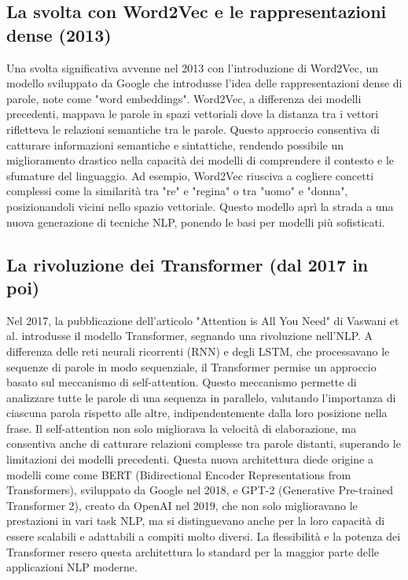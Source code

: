 \documentclass[target=mst,aauheader=,style=]{thud}
\begin{document}
\subsection{La svolta con Word2Vec e le rappresentazioni dense (2013)}
Una svolta significativa avvenne nel 2013 con l'introduzione di Word2Vec, un modello sviluppato da Google che introdusse l’idea delle rappresentazioni dense di parole, note come "word embeddings". Word2Vec, a differenza dei modelli precedenti, mappava le parole in spazi vettoriali dove la distanza tra i vettori rifletteva le relazioni semantiche tra le parole. Questo approccio consentiva di catturare informazioni semantiche e sintattiche, rendendo possibile un miglioramento drastico nella capacità dei modelli di comprendere il contesto e le sfumature del linguaggio. Ad esempio, Word2Vec riusciva a cogliere concetti complessi come la similarità tra "re" e "regina" o tra "uomo" e "donna", posizionandoli vicini nello spazio vettoriale. Questo modello aprì la strada a una nuova generazione di tecniche NLP, ponendo le basi per modelli più sofisticati.\cite{mikolov_2013}

\subsection{La rivoluzione dei Transformer (dal 2017 in poi)}
Nel 2017, la pubblicazione dell’articolo "Attention is All You Need" di Vaswani et al.\cite{vaswani_2023attention_is_all_you_need} introdusse il modello Transformer, segnando una rivoluzione nell’NLP. A differenza delle reti neurali ricorrenti (RNN) e degli LSTM, che processavano le sequenze di parole in modo sequenziale, il Transformer permise un approccio basato sul meccanismo di self-attention. Questo meccanismo permette di analizzare tutte le parole di una sequenza in parallelo, valutando l’importanza di ciascuna parola rispetto alle altre, indipendentemente dalla loro posizione nella frase. Il self-attention non solo migliorava la velocità di elaborazione, ma consentiva anche di catturare relazioni complesse tra parole distanti, superando le limitazioni dei modelli precedenti. Questa nuova architettura diede origine a modelli come come BERT (Bidirectional Encoder Representations from Transformers), sviluppato da Google nel 2018, e GPT-2 (Generative Pre-trained Transformer 2), creato da OpenAI nel 2019, che non solo miglioravano le prestazioni in vari task NLP, ma si distinguevano anche per la loro capacità di essere scalabili e adattabili a compiti molto diversi. La flessibilità e la potenza dei Transformer resero questa architettura lo standard per la maggior parte delle applicazioni NLP moderne.\cite{hadi_2024}
\end{document}
